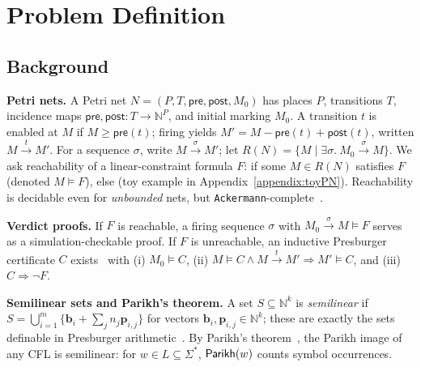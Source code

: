 \vspace{-3.5pt}
\section{Problem Definition}
\label{sec:problem-definition}


\subsection{Background}
\label{subsec:background}

\textbf{Petri nets.}
A Petri net $N=(P,T,\mathsf{pre},\mathsf{post},M_0)$ has places $P$, transitions $T$, incidence maps $\mathsf{pre},\mathsf{post}:T\to\mathbb N^P$, and initial marking $M_0$.
A transition $t$ is enabled at $M$ if $M\ge \mathsf{pre}(t)$; firing yields $M' = M - \mathsf{pre}(t) + \mathsf{post}(t)$, written $M\xrightarrow{t}M'$.
For a sequence $\sigma$, write $M\xrightarrow{\sigma}M'$; let $R(N)=\{M\mid \exists\sigma.\ M_0\xrightarrow{\sigma}M\}$.
We ask reachability of a linear-constraint formula $F$: \sat{} if some $M\in R(N)$ satisfies $F$ (denoted $M\models F$), else \unsat{} (toy example in Appendix~\ref{appendix:toyPN}).
Reachability is decidable even for \textit{unbounded} nets, but \texttt{Ackermann}-complete~\cite{Ma81,Ko82,La92,CzWo22,Le22}.



\medskip
\noindent
\textbf{Verdict proofs.}
If $F$ is reachable, a firing sequence $\sigma$ with $M_0\xrightarrow{\sigma}M\models F$ serves as a simulation-checkable proof. If $F$ is unreachable, an inductive Presburger certificate $C$ exists~\cite{Le09} with (i) $M_0\models C$, (ii) $M\models C\land M\xrightarrow{t}M'\Rightarrow M'\models C$, and (iii) $C\Rightarrow \neg F$.

\medskip
\noindent
\textbf{Semilinear sets and Parikh’s theorem.}
A set $S\subseteq\mathbb N^k$ is \emph{semilinear} if $S=\bigcup_{i=1}^m\{\mathbf b_i+\sum_{j}n_j\mathbf p_{i,j}\}$ for vectors $\mathbf b_i,\mathbf p_{i,j}\in\mathbb N^k$; these are exactly the sets definable in Presburger arithmetic~\cite{Pr29}.
By Parikh’s theorem~\cite{Parikh66}, the Parikh image of any CFL is semilinear: for $w\in L\subseteq\Sigma^*$, $\mathsf{Parikh}(w)$ counts symbol occurrences.




